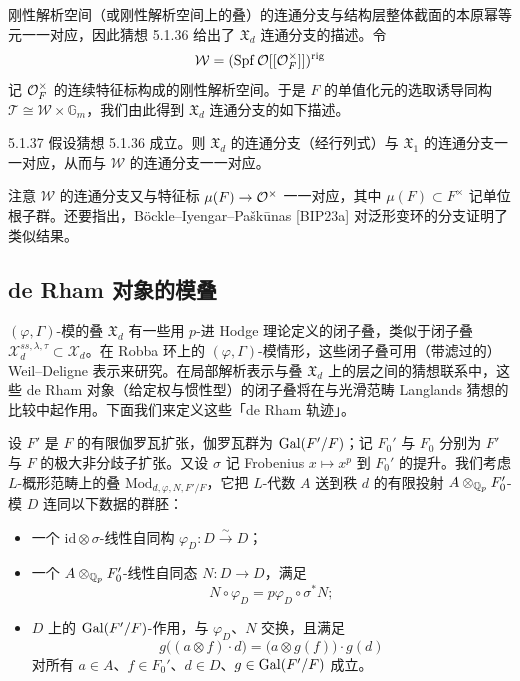 刚性解析空间（或刚性解析空间上的叠）的连通分支与结构层整体截面的本原幂等元一一对应，因此猜想 5.1.36 给出了 $\mathfrak{X}_d$ 连通分支的描述。令
\[
\mathcal{W}=(\operatorname{Spf}\mathcal{O}[[\mathcal{O}_F^\times]])^{\mathrm{rig}}
\]
记 $\mathcal{O}_F^\times$ 的连续特征标构成的刚性解析空间。于是 $F$ 的单值化元的选取诱导同构 $\mathcal{T}\cong\mathcal{W}\times\mathbb{G}_m$，我们由此得到 $\mathfrak{X}_d$ 连通分支的如下描述。

\begin{cor}{5.1.37}
假设猜想 5.1.36 成立。则 $\mathfrak{X}_d$ 的连通分支（经行列式）与 $\mathfrak{X}_1$ 的连通分支一一对应，从而与 $\mathcal{W}$ 的连通分支一一对应。
\label{thm:a4-5-1-37}
\end{cor}

注意 $\mathcal{W}$ 的连通分支又与特征标 $\mu(F)\to\mathcal{O}^\times$ 一一对应，其中 $\mu(F)\subset F^\times$ 记单位根子群。还要指出，Böckle--Iyengar--Paškūnas [BIP23a] 对泛形变环的分支证明了类似结果。

\subsection{de Rham 对象的模叠}

$(\varphi,\Gamma)$-模的叠 $\mathfrak{X}_d$ 有一些用 $p$-进 Hodge 理论定义的闭子叠，类似于闭子叠 $\mathcal{X}^{ss,\lambda,\tau}_d\subset\mathcal{X}_d$。在 Robba 环上的 $(\varphi,\Gamma)$-模情形，这些闭子叠可用（带滤过的）Weil--Deligne 表示来研究。在局部解析表示与叠 $\mathfrak{X}_d$ 上的层之间的猜想联系中，这些 de Rham 对象（给定权与惯性型）的闭子叠将在与光滑范畴 Langlands 猜想的比较中起作用。下面我们来定义这些「de Rham 轨迹」。

设 $F'$ 是 $F$ 的有限伽罗瓦扩张，伽罗瓦群为 $\operatorname{Gal}(F'/F)$；记 $F_0'$ 与 $F_0$ 分别为 $F'$ 与 $F$ 的极大非分歧子扩张。又设 $\sigma$ 记 Frobenius $x\mapsto x^p$ 到 $F_0'$ 的提升。我们考虑 $L$-概形范畴上的叠 $\mathrm{Mod}_{d,\varphi,N,F'/F}$，它把 $L$-代数 $A$ 送到秩 $d$ 的有限投射 $A\otimes_{\mathbb{Q}_p}F_0'$-模 $D$ 连同以下数据的群胚：
\begin{itemize}[leftmargin=2.2em,itemsep=0.2em]
\item 一个 $\mathrm{id}\otimes\sigma$-线性自同构 $\varphi_D: D\xrightarrow{\sim}D$；
\item 一个 $A\otimes_{\mathbb{Q}_p}F_0'$-线性自同态 $N: D\to D$，满足
\[
N\circ\varphi_D=p\varphi_D\circ\sigma^*N;
\]
\item $D$ 上的 $\operatorname{Gal}(F'/F)$-作用，与 $\varphi_D$、$N$ 交换，且满足
\[
g\bigl((a\otimes f)\cdot d\bigr)=\bigl(a\otimes g(f)\bigr)\cdot g(d)
\]
对所有 $a\in A$、$f\in F_0'$、$d\in D$、$g\in\operatorname{Gal}(F'/F)$ 成立。
\end{itemize}

